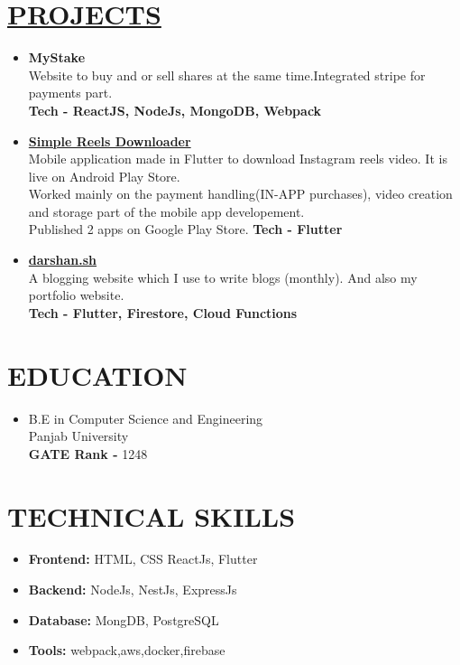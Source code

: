\documentclass[line, margin, 12pt]{res}
\begin{document}
\begin{resume}
\section{\hyperref[https://www.github.com/darshansharma]{PROJECTS}}
\begin{itemize}
\item \textbf{{MyStake}}\\
Website to buy and or sell shares at the same time.Integrated stripe for payments part. \\
 \textbf{Tech - ReactJS, NodeJs,  MongoDB, Webpack}
\item \textbf{\href{https://play.google.com/store/apps/details?id=com.darshansharma.simple_reels_downloader}{Simple Reels Downloader}}\\
Mobile application made in Flutter to download Instagram reels video. It is live on Android Play Store.\\
Worked mainly on the payment handling(IN-APP purchases), video creation and storage part of the mobile app developement.\\
Published 2 apps on Google Play Store.
 \textbf{Tech - Flutter}
\item \textbf{\href{https://darshan.sh}{darshan.sh }}\\
A blogging website which I use to write blogs (monthly). And also my portfolio website. \\
 \textbf{Tech - Flutter, Firestore, Cloud Functions}
\end{itemize}

\section{EDUCATION}
\begin{itemize}
\item B.E in Computer Science and Engineering \\
 Panjab University \\
\textbf{GATE Rank -} 1248
\end{itemize}

\section{TECHNICAL SKILLS}
\begin{itemize}
\item \textbf{Frontend:} HTML, CSS ReactJs, Flutter
\item \textbf{Backend:} NodeJs, NestJs, ExpressJs
\item \textbf{Database:} MongDB, PostgreSQL
\item \textbf{Tools:} webpack,aws,docker,firebase
\end{itemize}

\end{resume}
\end{document}
